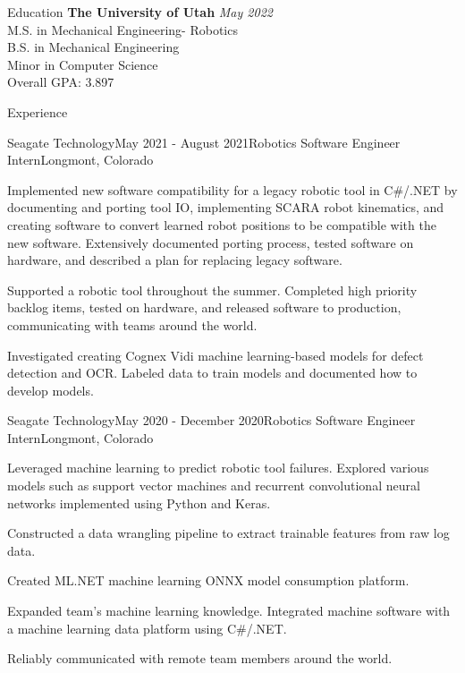 \documentclass{resume}
\begin{document}
  \begin{rSection}{Education}
    {\bf The University of Utah} \hfill {\em May 2022} \\ 
    { M.S. in Mechanical Engineering- Robotics } \\
    { B.S. in Mechanical Engineering } \\
    { Minor in Computer Science } \smallskip \\
    Overall GPA: 3.897 
  \end{rSection}
  
  \begin{rSection}{Experience}
  
    \begin{rSubsection}{Seagate Technology}{May 2021 - August 2021}{Robotics Software Engineer Intern}{Longmont, Colorado}
    \item Implemented new software compatibility for a legacy robotic tool in  C\#/.NET by documenting and porting tool IO, implementing SCARA robot kinematics, and creating software to convert learned robot positions to be compatible with the new software. 
    Extensively documented porting process, tested software on hardware, and described a plan for replacing legacy software.
    \item Supported a robotic tool throughout the summer. Completed high priority backlog items, tested on hardware, and released software to production, communicating with teams around the world.
    \item Investigated creating Cognex Vidi machine learning-based models for defect detection and OCR. Labeled data to train models and documented how to develop models.
    \end{rSubsection}
  
    \begin{rSubsection}{Seagate Technology}{May 2020 - December 2020}{Robotics Software Engineer Intern}{Longmont, Colorado}
    \item Leveraged machine learning to predict robotic tool failures. 
    Explored various models such as support vector machines and recurrent convolutional neural networks implemented using Python and Keras. 
    \item Constructed a data wrangling pipeline to extract trainable features from raw log data. 
    \item Created ML.NET machine learning ONNX model consumption platform.
    \item Expanded team’s machine learning knowledge. Integrated machine software with a machine learning data platform using C\#/.NET.
    \item Reliably communicated with remote team members around the world.
    \end{rSubsection}


\end{rSection}
\end{document}
